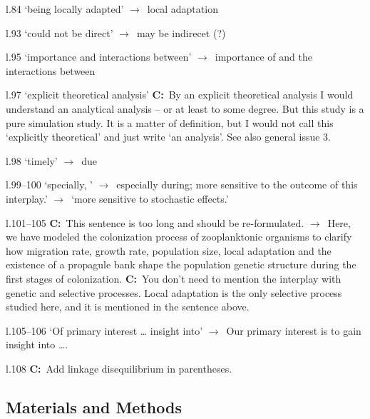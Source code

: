 \documentclass[11pt]{article}
\newenvironment{my_description}
{\begin{description}
  \setlength{\itemsep}{2pt}
  \setlength{\parskip}{0pt}
  \setlength{\parsep}{0pt}}
{\end{description}}
\newcommand{\ra}{$\rightarrow$\ }
\newcommand{\C}{\textbf{C:}\ }
\begin{document}
\begin{my_description}
	\item[l.84] `being locally adapted' \ra local adaptation
	\item[l.93] `could not be direct' \ra may be indirecet (?)
	\item[l.95] `importance and interactions between' \ra importance of and the interactions between
	\item[l.97] `explicit theoretical analysis' \C By an explicit theoretical analysis I would understand an analytical analysis -- or at least to some degree. But this study is a pure simulation study. It is a matter of definition, but I would not call this `explicitly theoretical' and just write `an analysis'. See also general issue 3.
	\item[l.98] `timely' \ra due
	\item[l.99--100] `specially, ' \ra especially during; more sensitive to the outcome of this interplay.' \ra `more sensitive to stochastic effects.'
	\item[l.101--105] \C This sentence is too long and should be re-formulated. \ra Here, we have modeled the colonization process of zooplanktonic organisms to clarify how migration rate, growth rate, population size, local adaptation and the existence of a propagule bank shape the population genetic structure during the first stages of colonization. \C You don't need to mention the interplay with genetic and selective processes. Local adaptation is the only selective process studied here, and it is mentioned in the sentence above.
	\item[l.105--106] `Of primary interest \ldots{} insight into' \ra Our primary interest is to gain insight into \ldots{}.
	\item[l.108] \C Add linkage disequilibrium in parentheses.
\end{my_description}

\subsection{Materials and Methods}
\end{document}
